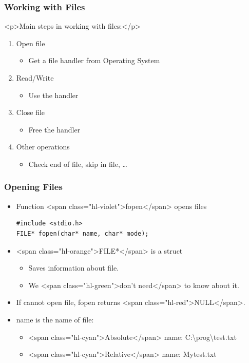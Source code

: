 \documentclass{../c-lecture}
\begin{document}
\begin{frame}
  \frametitle{Working with Files}
  <p>Main steps in working with files:</p>
  \begin{enumerate}
    \item Open file
    \begin{itemize}
      \item Get a file handler from Operating System
    \end{itemize}
    \item Read/Write
    \begin{itemize}
      \item Use the handler
    \end{itemize}
    \item Close file
    \begin{itemize}
      \item Free the handler
    \end{itemize}
    \item Other operations
    \begin{itemize}
      \item Check end of file, skip in file, \ldots
    \end{itemize}
  \end{enumerate}
\end{frame}

\begin{frame}[fragile]
  \frametitle{Opening Files}
  \begin{itemize}
    \item Function <span class="hl-violet">fopen</span> opens files
    \begin{verbatim}
#include <stdio.h>
FILE* fopen(char* name, char* mode);
    \end{verbatim}
    \item <span class="hl-orange">FILE*</span> is a struct
    \begin{itemize}
      \item Saves information about file.
      \item We <span class="hl-green">don’t need</span> to know about it.
    \end{itemize}
    \item
      If cannot open file, fopen returns <span class="hl-red">NULL</span>.

    \item name is the name of file:
    \begin{itemize}
      \item <span class="hl-cyan">Absolute</span> name: C:\textbackslash prog\textbackslash test.txt
      \item <span class="hl-cyan">Relative</span> name: Mytest.txt
    \end{itemize}
  \end{itemize}
\end{frame}
\end{document}
